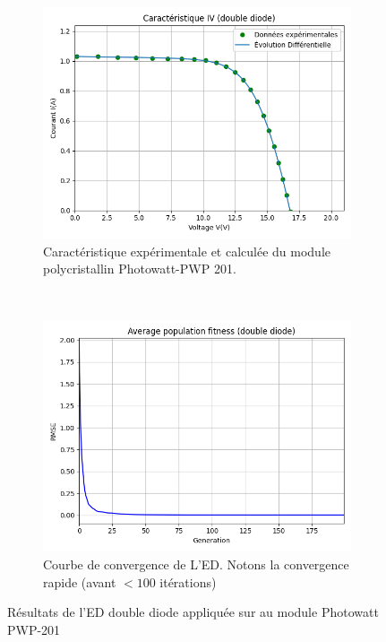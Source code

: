 \begin{figure}
    \centering
    \begin{subfigure}[b]{0.45\textwidth}
        \includegraphics[width=\textwidth]{resources/pwp/doubled/iv.png}
        \caption{Caractéristique expérimentale et calculée du module polycristallin Photowatt-PWP 201.}
    \end{subfigure}
    ~
    \begin{subfigure}[b]{0.45\textwidth}
        \includegraphics[width=\textwidth]{resources/pwp/doubled/fitness.png}
        \caption{Courbe de convergence de L'ED. Notons la convergence rapide (avant $< 100$ itérations)}
    \end{subfigure}
    \caption{Résultats de l'ED double diode appliquée sur au module Photowatt PWP-201}
    \label{fig:pwpdoublecarac}
\end{figure}%
